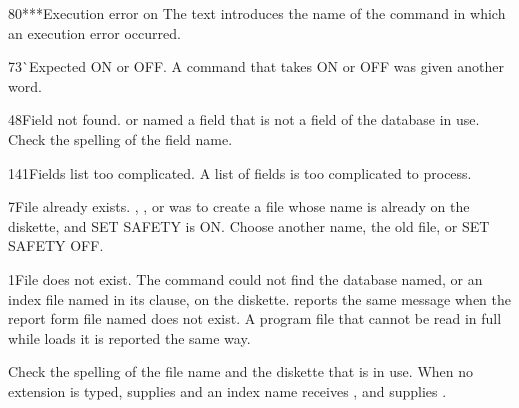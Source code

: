 \begin{XbaseMessageEntry}{80}{***Execution error on}
The text introduces the name of the command in which an execution error occurred.
\end{XbaseMessageEntry}

\begin{XbaseMessageEntry}{73}{^^ Expected ON or OFF.}
A command that takes ON or OFF was given another word.
\end{XbaseMessageEntry}

\begin{XbaseMessageEntry}{48}{Field not found.}
 or  named a field that is not a field of the database in use.  Check the spelling of the field name.
\end{XbaseMessageEntry}

\begin{XbaseMessageEntry}{141}{Fields list too complicated.}
A list of fields is too complicated to process.
\end{XbaseMessageEntry}

\begin{XbaseMessageEntry}{7}{File already exists.}
, ,  or  was to create a file whose name is already on the diskette, and SET SAFETY is ON.  Choose another name,  the old file, or SET SAFETY OFF.
\end{XbaseMessageEntry}

\begin{XbaseMessageEntry}{1}{File does not exist.}
The  command could not find the database named, or an index file named in its  clause, on the diskette.  reports the same message when the report form file named does not exist. A program file that cannot be read in full while  loads it is reported the same way.

Check the spelling of the file name and the diskette that is in use. When no extension is typed,  supplies  and an index name receives , and  supplies .
\end{XbaseMessageEntry}


